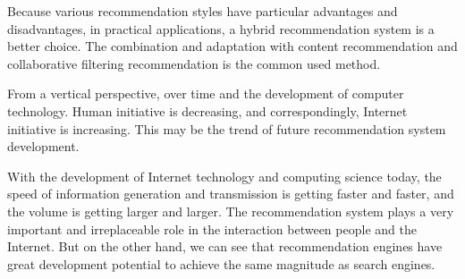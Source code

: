 \par Because various recommendation styles have particular advantages and disadvantages, in practical applications, a hybrid recommendation system is a better choice. The combination and adaptation with content recommendation and collaborative filtering recommendation is the common used method.
\par From a vertical perspective, over time and the development of computer technology. Human initiative is decreasing, and correspondingly, Internet initiative is increasing. This may be the trend of future recommendation system development.
\par With the development of Internet technology and computing science today, the speed of information generation and transmission is getting faster and faster, and the volume is getting larger and larger. The recommendation system plays a very important and irreplaceable role in the interaction between people and the Internet. But on the other hand, we can see that recommendation engines have great development potential to achieve the same magnitude as search engines.
 


\cleardoublepage
